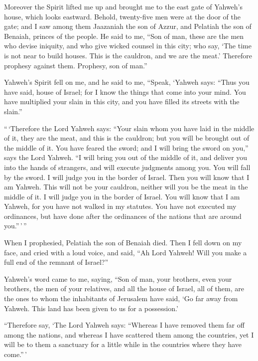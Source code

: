  Moreover the Spirit lifted me up and brought me to the
east gate of Yahweh's house, which looks eastward. Behold, twenty-five
men were at the door of the gate; and I saw among them Jaazaniah the son
of Azzur, and Pelatiah the son of Benaiah, princes of the people.
 He said to me, ``Son of man, these are the men who devise
iniquity, and who give wicked counsel in this city;  who
say, `The time is not near to build houses. This is the cauldron, and we
are the meat.'  Therefore prophesy against them. Prophesy,
son of man.''

 Yahweh's Spirit fell on me, and he said to me, ``Speak,
`Yahweh says: ``Thus you have said, house of Israel; for I know the
things that come into your mind.  You have multiplied your
slain in this city, and you have filled its streets with the slain.''

 ``\,`Therefore the Lord Yahweh says: ``Your slain whom
you have laid in the middle of it, they are the meat, and this is the
cauldron; but you will be brought out of the middle of it.
 You have feared the sword; and I will bring the sword on
you,'' says the Lord Yahweh.  ``I will bring you out of
the middle of it, and deliver you into the hands of strangers, and will
execute judgments among you.  You will fall by the sword.
I will judge you in the border of Israel. Then you will know that I am
Yahweh.  This will not be your cauldron, neither will you
be the meat in the middle of it. I will judge you in the border of
Israel.  You will know that I am Yahweh, for you have not
walked in my statutes. You have not executed my ordinances, but have
done after the ordinances of the nations that are around you.''\,'\,''

 When I prophesied, Pelatiah the son of Benaiah died.
Then I fell down on my face, and cried with a loud voice, and said, ``Ah
Lord Yahweh! Will you make a full end of the remnant of Israel?''

 Yahweh's word came to me, saying,  ``Son
of man, your brothers, even your brothers, the men of your relatives,
and all the house of Israel, all of them, are the ones to whom the
inhabitants of Jerusalem have said, `Go far away from Yahweh. This land
has been given to us for a possession.'

 ``Therefore say, `The Lord Yahweh says: ``Whereas I have
removed them far off among the nations, and whereas I have scattered
them among the countries, yet I will be to them a sanctuary for a little
while in the countries where they have come.''\,'

